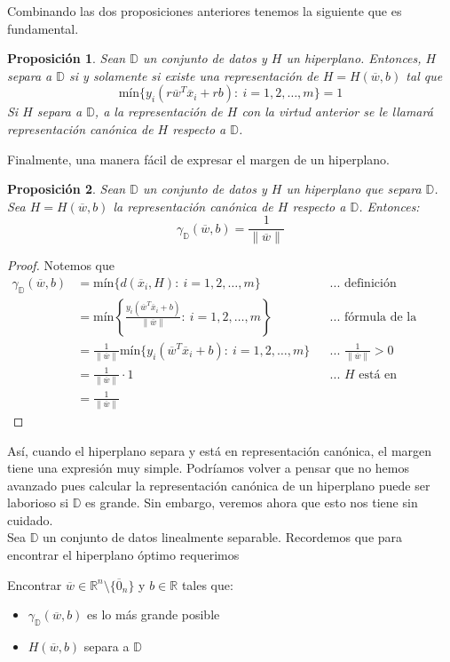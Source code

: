 \documentclass[11pt]{article}
\newtheorem{proposition}{Proposición}[section]
\newcommand{\R}{\mathbb{R}}
\newcommand{\Rn}{\R^{n}}
\newcommand{\wv}{\overline{w}}
\newcommand{\x}{\overline{x}}
\newcommand{\z}{\overline{0}_{n}}
\newcommand{\Rnz}{\Rn\setminus\{\z\}}
\newcommand{\Sm}{1,2,\ldots, m}
\newcommand{\Dat}{\mathbb{D}}
\newcommand{\nw}{\|\wv\|}
\begin{document}
Combinando las dos proposiciones anteriores tenemos la siguiente que es fundamental.

\begin{proposition}
Sean $\Dat$ un conjunto de datos y $H$ un hiperplano. Entonces, $H$ separa a $\Dat$ si y solamente si existe una representación de $H=H(\wv, b)$ tal que
$$\text{mín}\{y_{i}(r\wv^{T}\x_{i}+rb):\ i=\Sm \}=1$$
Si $H$ separa a $\Dat$, a la representación de $H$ con la virtud anterior se le llamará \emph{representación canónica de $H$ respecto a $\Dat$}.
\end{proposition}

Finalmente, una manera fácil de expresar el margen de un hiperplano.

\begin{proposition}
Sean $\Dat$ un conjunto de datos y $H$ un hiperplano que separa $\Dat$. Sea $H=H(\wv, b)$ la representación canónica de $H$ respecto a $\Dat$. Entonces:
$$\gamma_{\Dat}(\wv, b)=\frac{1}{\nw}$$
\end{proposition}
\begin{proof}
Notemos que
\begin{equation*}
\begin{aligned}
\gamma_{\Dat}(\wv, b)&=\text{mín}\{d(\x_{i}, H):\ i=\Sm\} &&\text{... definición}\\
&=\text{mín}\left\{\frac{y_{i}(\wv^{T}\x_{i}+b)}{\nw}:\ i=\Sm\right\} &&\text{... fórmula de la distancia}\\
&=\frac{1}{\nw}\text{mín}\{y_{i}(\wv^{T}\x_{i}+b):\ i=\Sm\} &&\text{... $\frac{1}{\nw}>0$}\\
&=\frac{1}{\nw}\cdot 1 &&\text{... $H$ está en representación canónica}\\
&=\frac{1}{\nw}
\end{aligned}
\end{equation*}
\end{proof}

Así, cuando el hiperplano separa y está en representación canónica, el margen tiene una expresión muy simple. Podríamos volver a pensar que no hemos avanzado pues calcular la representación canónica de un hiperplano puede ser laborioso si $\Dat$ es grande. Sin embargo, veremos ahora que esto nos tiene sin cuidado.\\

Sea $\Dat$ un conjunto de datos linealmente separable. Recordemos que para encontrar el hiperplano óptimo requerimos
\begin{center}
Encontrar $\wv\in\Rnz$ y $b\in\R$ tales que:\\
\begin{itemize}
\item $\gamma_{\Dat}(\wv, b)$ es lo más grande posible
\item $H(\wv, b)$ separa a $\Dat$\\
\end{itemize}
\end{center}
\end{document}
